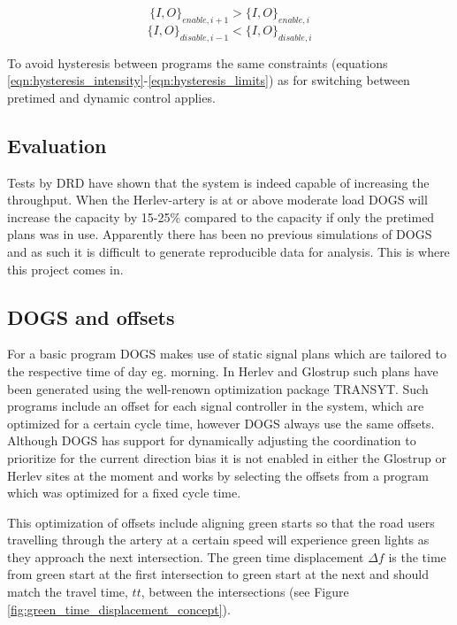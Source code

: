 $$\lbrace I,O \rbrace_{enable,i+1} > \lbrace I,O \rbrace_{enable,i}$$
$$\lbrace I,O \rbrace_{disable,i-1} < \lbrace I,O \rbrace_{disable,i}$$

To avoid hysteresis between programs the same constraints (equations \ref{eqn:hysteresis_intensity}-\ref{eqn:hysteresis_limits}) as for switching between pretimed and dynamic control applies.

\subsection{Evaluation}
Tests by DRD \cite{dogs} have shown that the system is indeed capable of increasing the throughput. When the Herlev-artery is at or above moderate load DOGS will increase the capacity by 15-25\% compared to the capacity if only the pretimed plans was in use. Apparently there has been no previous simulations of DOGS and as such it is difficult to generate reproducible data for analysis. This is where this project comes in.

\subsection{DOGS and offsets}
\label{dogs_offset}

For a basic program DOGS makes use of static signal plans which are tailored to the respective time of day eg. morning. In Herlev and Glostrup such plans have been generated using the well-renown optimization package TRANSYT. Such programs include an offset for each signal controller in the system, which are optimized for a certain cycle time, however DOGS always use the same offsets. Although DOGS has support for dynamically adjusting the coordination to prioritize for the current direction bias it is not enabled in either the Glostrup or Herlev sites at the moment and works by selecting the offsets from a program which was optimized for a fixed cycle time.

This optimization of offsets include aligning green starts so that the road users travelling through the artery at a certain speed will experience green lights as they approach the next intersection. The green time displacement $\Delta f$ is the time from green start at the first intersection to green start at the next and should match the travel time, $tt$, between the intersections (see Figure \ref{fig:green_time_displacement_concept}). 

